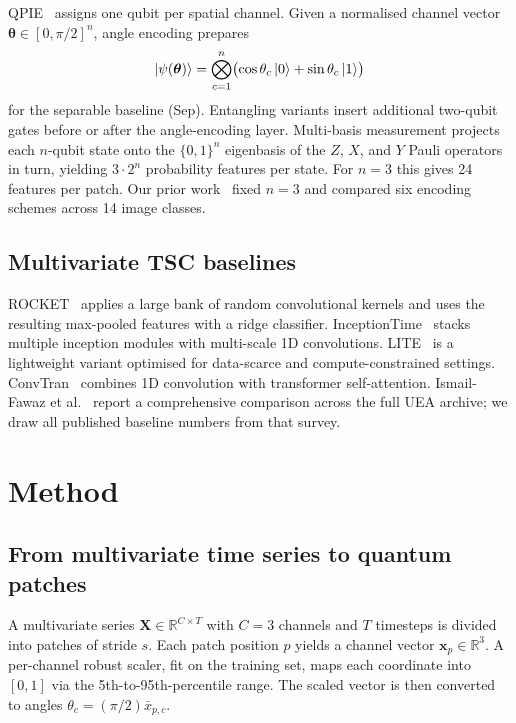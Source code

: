 \documentclass[conference,compsoc]{IEEEtran}
\begin{document}
QPIE~\cite{yao2017quantum} assigns one qubit per spatial channel.
Given a normalised channel vector $\boldsymbol{\theta} \in [0, \pi/2]^n$,
angle encoding prepares
\begin{equation}
  \ket{\psi(\boldsymbol{\theta})} =
  \bigotimes_{c=1}^{n}
  \bigl(\cos\theta_c \ket{0} + \sin\theta_c \ket{1}\bigr)
  \label{eq:sep}
\end{equation}
for the separable baseline (Sep).
Entangling variants insert additional two-qubit gates before or after
the angle-encoding layer.
Multi-basis measurement projects each $n$-qubit state onto the
$\{0,1\}^n$ eigenbasis of the $Z$, $X$, and $Y$ Pauli operators in
turn, yielding $3 \cdot 2^n$ probability features per state.
For $n=3$ this gives 24 features per patch.
Our prior work~\cite{atadana2026qpie} fixed $n=3$ and compared six
encoding schemes across 14 image classes.

\subsection{Multivariate TSC baselines}

ROCKET~\cite{dempster2020rocket} applies a large bank of random
convolutional kernels and uses the resulting max-pooled features with
a ridge classifier.
InceptionTime~\cite{fawaz2020inceptiontime} stacks multiple inception
modules with multi-scale 1D convolutions.
LITE~\cite{ismail2025lite} is a lightweight variant optimised for
data-scarce and compute-constrained settings.
ConvTran~\cite{foumani2024convtran} combines 1D convolution with
transformer self-attention.
Ismail-Fawaz et al.~\cite{ismail2025lite} report a comprehensive
comparison across the full UEA archive; we draw all published baseline
numbers from that survey.

\section{Method}
\label{sec:method}

\subsection{From multivariate time series to quantum patches}
\label{sec:patching}

A multivariate series $\mathbf{X} \in \mathbb{R}^{C \times T}$
with $C = 3$ channels and $T$ timesteps is divided into patches of
stride $s$. Each patch position $p$ yields a channel vector
$\mathbf{x}_p \in \mathbb{R}^3$.
A per-channel robust scaler, fit on the training set, maps each
coordinate into $[0, 1]$ via the 5th-to-95th-percentile range.
The scaled vector is then converted to angles
$\theta_c = (\pi/2)\bar{x}_{p,c}$.
\end{document}
